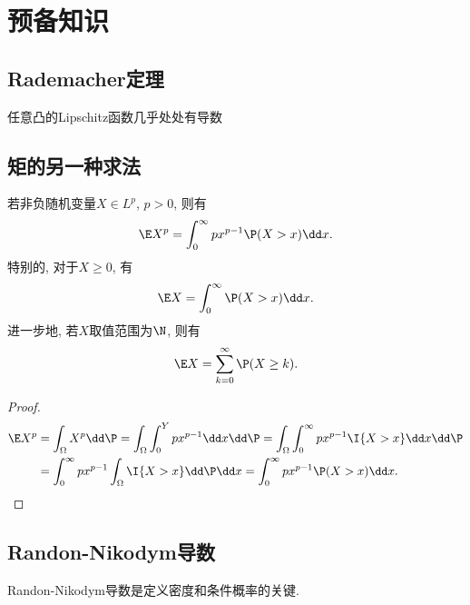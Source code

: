 \section{预备知识}

\subsection{Rademacher定理}

\begin{theorem}[Rademacher]\label{thm:Rademacher}
	任意凸的Lipschitz函数几乎处处有导数
\end{theorem}

\subsection{矩的另一种求法}

\begin{lemma}\label{lemma:trickOfExpectation}
	若非负随机变量$X \in L^p$, $p > 0$, 则有
	\begin{equation}
		\E X^p = \int_0^{\infty} p x^{p-1} \P(X > x) \dd x. 
	\end{equation}
	特别的, 对于$X \geq 0$, 有
	\begin{equation*}
		\E X = \int_0^{\infty} \P(X > x) \dd x. 
	\end{equation*}
	进一步地, 若$X$取值范围为$\N$, 则有
	\begin{equation*}
		\E X = \sum_{k=0}^{\infty} \P(X \geq k). 
	\end{equation*}
\end{lemma}
\begin{proof}
	\begin{align*}
		\E X^p 
		&= \int_\Omega X^p \dd \P 
		= \int_\Omega \int_0^Y p x^{p-1} \dd x \dd \P 
		= \int_\Omega \int_0^{\infty} p x^{p-1} \I{X > x} \dd x \dd \P \\
		&= \int_0^{\infty} p x^{p-1} \int_\Omega \I{X > x} \dd \P \dd x
		= \int_0^{\infty} p x^{p-1} \P(X > x) \dd x.
	\end{align*}
\end{proof}






\subsection{Randon-Nikodym导数}

Randon-Nikodym导数是定义密度和条件概率的关键. 

